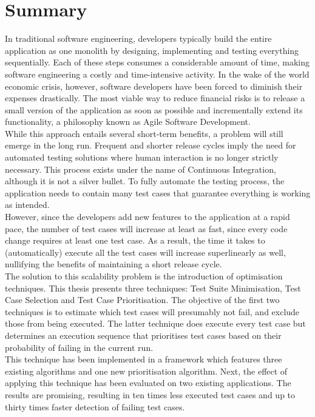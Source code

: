 
\chapter*{Summary}
In traditional software engineering, developers typically build the entire application as one monolith by designing, implementing and testing everything sequentially. Each of these steps consumes a considerable amount of time, making software engineering a costly and time-intensive activity. In the wake of the world economic crisis, however, software developers have been forced to diminish their expenses drastically. The most viable way to reduce financial risks is to release a small version of the application as soon as possible and incrementally extend its functionality, a philosophy known as Agile Software Development.\\

\noindent While this approach entails several short-term benefits, a problem will still emerge in the long run. Frequent and shorter release cycles imply the need for automated testing solutions where human interaction is no longer strictly necessary. This process exists under the name of Continuous Integration, although it is not a silver bullet. To fully automate the testing process, the application needs to contain many test cases that guarantee everything is working as intended. \\

\noindent However, since the developers add new features to the application at a rapid pace, the number of test cases will increase at least as fast, since every code change requires at least one test case. As a result, the time it takes to (automatically) execute all the test cases will increase superlinearly as well, nullifying the benefits of maintaining a short release cycle.\\

\noindent The solution to this scalability problem is the introduction of optimisation techniques. This thesis presents three techniques: Test Suite Minimisation, Test Case Selection and Test Case Prioritisation. The objective of the first two techniques is to estimate which test cases will presumably not fail, and exclude those from being executed. The latter technique does execute every test case but determines an execution sequence that prioritises test cases based on their probability of failing in the current run.\\

\noindent This technique has been implemented in a framework which features three existing algorithms and one new prioritisation algorithm. Next, the effect of applying this technique has been evaluated on two existing applications. The results are promising, resulting in ten times less executed test cases and up to thirty times faster detection of failing test cases.\\